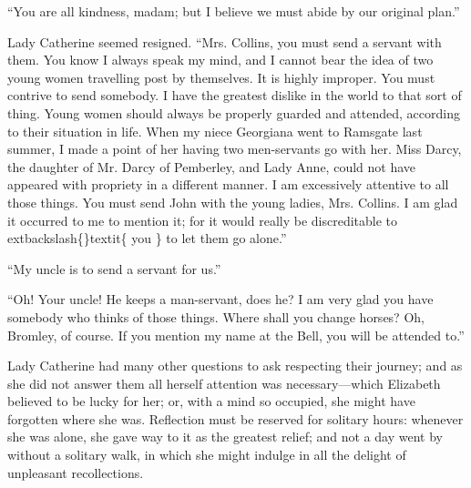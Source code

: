 \documentclass[10pt]{book}
\begin{document}
   “You are all kindness, madam; but I believe we must abide by our
original plan.”
  

   Lady Catherine seemed resigned. “Mrs. Collins, you must send a servant
with them. You know I always speak my mind, and I cannot bear the idea
of two young women travelling post by themselves. It is highly improper.
You must contrive to send somebody. I have the greatest dislike in the
world to that sort of thing. Young women should always be properly
guarded and attended, according to their situation in life. When my
niece Georgiana went to Ramsgate last summer, I made a point of her
having two men-servants go with her. Miss Darcy, the daughter of Mr.
Darcy of Pemberley, and Lady Anne, could not have appeared with
propriety in a different manner. I am excessively attentive to all those
things. You must send John with the young ladies, Mrs. Collins. I am
glad it occurred to me to mention it; for it would really be
discreditable to
   	extbackslash\{\}textit\{
    you
   \}
   to let them go alone.”
  

   “My uncle is to send a servant for us.”
  

   “Oh! Your uncle! He keeps a man-servant, does he? I am very glad you
have somebody who thinks of those things. Where shall you change horses?
Oh, Bromley, of course. If you mention my name at the Bell, you will be
attended to.”
  

   Lady Catherine had many other questions to ask respecting their journey;
and as she did not answer them all herself attention was
necessary—which Elizabeth
   believed to be lucky for her; or, with a
mind so occupied, she might have forgotten where she was. Reflection
must be reserved for solitary hours: whenever she was alone, she gave
way to it as the greatest relief; and not a day went by without a
solitary walk, in which she might indulge in all the delight of
unpleasant recollections.
  
\end{document}
